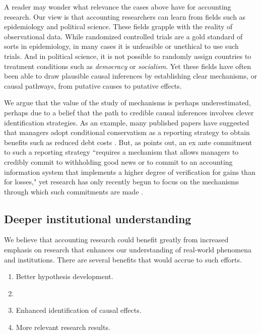 \documentclass[11pt]{amsart}
\begin{document}
A reader may wonder what relevance the cases above have for accounting research.
Our view is that accounting researchers can learn from fields such as epidemiology and political science. 
These fields grapple with the reality of observational data.
While randomized controlled trials are a gold standard of sorts in epidemiology, in many cases it is unfeasible or unethical to use such trials.
And in political science, it is not possible to randomly assign countries to treatment conditions such as \emph{democracy} or \emph{socialism}.
Yet these fields have often been able to draw plausible causal inferences by establishing clear mechanisms, or causal pathways, from putative causes to putative effects.

We argue that the value of the study of mechanisms is perhaps underestimated, perhaps due to a belief that the path to credible causal inferences involves clever identification strategies.
As an example, many published papers have suggested that managers adopt conditional conservatism as a reporting strategy to obtain benefits such as reduced debt costs \citep{Ahmed:2002aa,Zhang:2008bc}.
But, as \citet[p\,317]{Beyer:2010cj} points out, an ex ante commitment to such a reporting strategy ``requires a mechanism that allows managers to credibly commit to withholding good news or to commit to an accounting information system that implements a higher degree of verification for gains than for losses," yet research has only recently begun to focus on the mechanisms through which such commitments are made \citep[e.g.,][]{Erkens:2014hj}.




\subsection{Deeper institutional understanding}

We believe that accounting research could benefit greatly from increased emphasis on research that enhances our understanding of real-world phenomena and institutions. There are several benefits that would accrue to such efforts.

\begin{enumerate}
\item Better hypothesis development.  
\item %
\item Enhanced identification of causal effects.
\item More relevant research results.
\end{enumerate}
\end{document}
